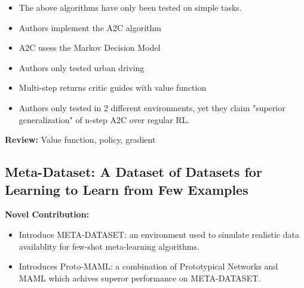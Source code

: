 \documentclass{article}
\begin{document}
\begin{itemize}
	\item The above algorithms have only been tested on simple tasks.
	
	\item Authors implement the A2C algorithm
	
	\item A2C usess the Markov Decision Model
	
	\item Authors only tested urban driving
	
	\item Multi-step returns critic guides with value function
	
	\item Authors only tested in 2 different environments, yet they claim "superior generalization" of n-step A2C over regular RL.
	
	
	
\end{itemize}

\textbf{Review:} Value function, policy, gradient

\subsection*{Meta-Dataset: A Dataset of Datasets for Learning to Learn from Few Examples} 
	\textbf{Novel Contribution:} 
	\begin{itemize}
		\item Introduce META-DATASET: an environment used to simulate realistic data availablity for few-shot meta-learning algorithms.
		\item Introduces Proto-MAML: a combination of Prototypical Networks and MAML which achives superor performance on META-DATASET.
	\end{itemize}
	
\end{document}
